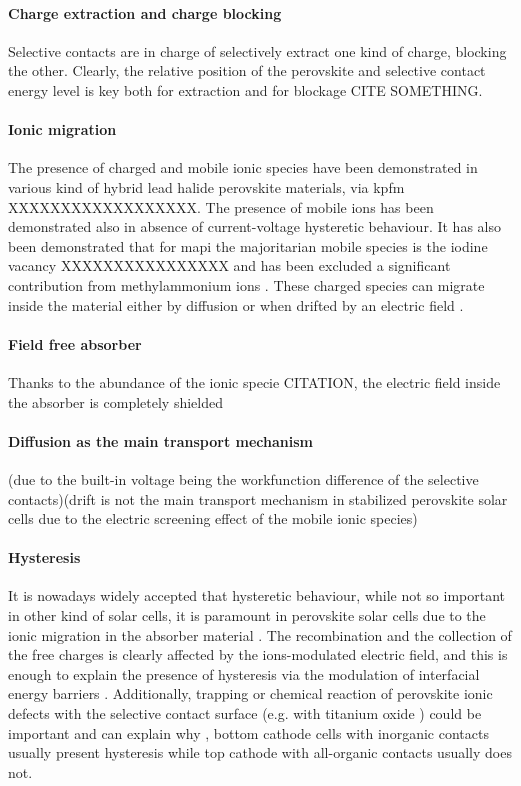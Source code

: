\paragraph{Charge extraction and charge blocking}
Selective contacts are in charge of selectively extract one kind of charge, blocking the other. Clearly, the relative position of the perovskite and selective contact energy level is key both for extraction \cite{CorreaBaena2015} and for blockage CITE SOMETHING.

	\paragraph{Ionic migration}
	The presence of charged and mobile ionic species have been demonstrated in various kind of hybrid lead halide perovskite materials, via \gls{kpfm} \cite{Birkhold2018} XXXXXXXXXXXXXXXXXX.
	The presence of mobile ions has been demonstrated also in absence of current-voltage hysteretic behaviour\cite{Calado2016,Jacobs2018}.
	It has also been demonstrated that for \gls{mapi} the majoritarian mobile species is the iodine vacancy XXXXXXXXXXXXXXXX \cite{Senocrate2017} and has been excluded a significant contribution from methylammonium ions \cite{Senocrate2018,Senocrate2017}.
	These charged species can migrate inside the material either by diffusion or when drifted by an electric field \cite{Xiao2014}.
	
	\paragraph{Field free absorber}
	Thanks to the abundance of the ionic specie CITATION, the electric field inside the absorber is completely shielded \cite{Tress2015}
	
	\paragraph{Diffusion as the main transport mechanism}(due to the built-in voltage being the workfunction difference of the selective contacts)(drift is not the main transport mechanism in stabilized perovskite solar cells due to the electric screening effect of the mobile ionic species)


\paragraph{Hysteresis}
It is nowadays widely accepted that hysteretic behaviour, while not so important in other kind of solar cells, it is paramount in perovskite solar cells due to the ionic migration in the absorber material \cite{Unger2014,Xiao2014}. 
The recombination and the collection of the free charges is clearly affected by the ions-modulated electric field, and this is enough to explain the presence of hysteresis \cite{Tress2015,Calado2016} via the modulation of interfacial energy barriers \cite{Moia2019}.
Additionally, trapping or chemical reaction of perovskite ionic defects with the selective contact surface (e.g. with titanium oxide \cite{Yu2016,Beilsten-Edmands2015}) could be important and can explain why \cite{Moia2019}, bottom cathode cells with inorganic contacts usually present hysteresis while top cathode with all-organic contacts usually does not. 

